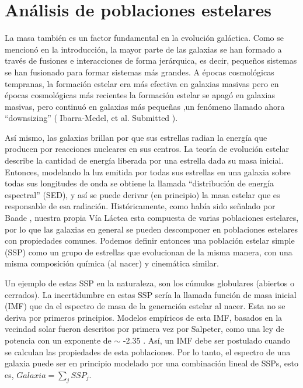\section{Análisis de poblaciones estelares}

La masa también es un factor fundamental en la evolución galáctica. Como se mencionó en la introducción, la mayor parte de las galaxias se han formado a través de fusiones e interacciones de forma jerárquica, es decir, pequeños sistemas se han fusionado para formar sistemas más grandes. A épocas cosmológicas tempranas, la formación estelar era más efectiva en galaxias masivas pero en épocas cosmológicas más recientes la formación estelar se apagó en galaxias masivas, pero continuó en galaxias más pequeñas ,un fenómeno llamado ahora ``downsizing'' \citep{corteau2014} ({\color{red} Ibarra-Medel, et al. Submitted }).

\bigskip

\noindent Así mismo, las galaxias brillan por que sus estrellas radian la energía que producen por reacciones nucleares en sus centros. La teoría de evolución estelar describe la cantidad de energía liberada  por una estrella dada su masa inicial. Entonces, modelando la luz emitida por todas sus estrellas en una galaxia sobre todas sus longitudes de onda se obtiene la llamada ``distribución de energía espectral'' (SED), y así se puede derivar (en principio) la masa estelar que es responsable de esa radiación. Históricamente, como había sido señalado por Baade \citep{baade1957}, nuestra propia Vía Láctea esta compuesta de varias poblaciones estelares, por lo que las galaxias en general se pueden descomponer en poblaciones estelares con propiedades comunes. Podemos definir entonces una población estelar simple (SSP) como un grupo de estrellas que evolucionan de la misma manera, con una misma composición química (al nacer) y cinemática similar.

\bigskip

\noindent Un ejemplo de estas SSP en la naturaleza, son los cúmulos globulares (abiertos o cerrados). La incertidumbre  en estas SSP sería la llamada función de masa inicial (IMF) que da el espectro de masa de la generación estelar al nacer. Esta no se deriva por primeros principios. Modelos  empíricos de esta IMF, basados en la vecindad solar fueron  descritos por primera vez por Salpeter, como una ley de potencia con un exponente de $\sim$ -2.35 \citep{salpeter1955}. Así, un IMF debe ser postulado cuando se calculan  las propiedades de esta poblaciones. Por lo tanto, el espectro de una galaxia puede ser en principio modelado por una combinación lineal de SSPs, esto es, $ Galaxia = \sum_{j} SSP_{j}$.

